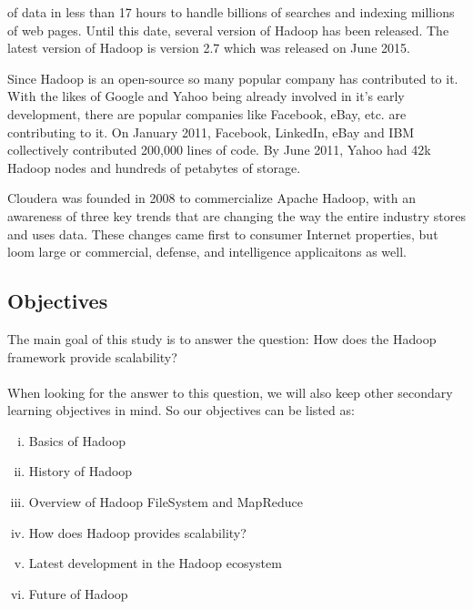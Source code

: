 \documentclass[a4paper,12pt,oneside]{report}
\begin{document}
of data in less than 17 hours to handle billions of searches and indexing millions of web pages.
Until this date, several version of Hadoop has been released. The latest version of Hadoop is version 2.7 which was released on June 2015.
\par Since Hadoop is an open-source so many popular company has contributed to it. With the likes of Google and Yahoo being already involved in it's early
development, there are popular companies like Facebook, eBay, etc. are contributing to it. On January 2011, Facebook, LinkedIn, eBay and IBM collectively contributed 200,000 lines of code. By June 2011, Yahoo had 
42k Hadoop nodes and hundreds of petabytes of storage.\cite{Wikiapache}
\par Cloudera was founded in 2008 to commercialize Apache Hadoop, with an awareness of three key trends that are changing the way the entire industry stores and uses data. These changes came first to consumer Internet properties, but loom large or commercial, defense, and
intelligence applicaitons as well.

\subsection{Objectives}
The main goal of this study is to answer the question: How does the Hadoop framework
provide scalability?\\
\\
When looking for the answer to this question, we will also keep other secondary learning
objectives in mind. So our objectives can be listed as:
\begin{enumerate}[(i)]
        \item Basics of Hadoop
        \item History of Hadoop
        \item Overview of Hadoop FileSystem and MapReduce
        \item How does Hadoop provides scalability?
        \item Latest development in the Hadoop ecosystem
        \item Future of Hadoop
\end{enumerate}
\end{document}
